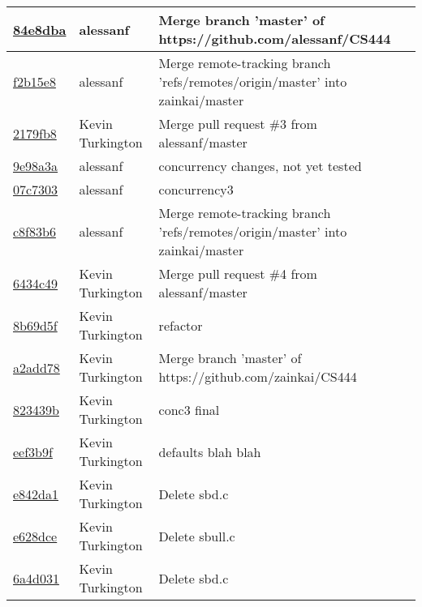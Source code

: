 \begin{tabular}{l l l}
\href{https://github.com/zainkai/CS444/commit/84e8dbaa2bb41903b99d0541490d3b34dc2dabea}{84e8dba} & alessanf & Merge branch 'master' of https://github.com/alessanf/CS444\\\hline
\href{https://github.com/zainkai/CS444/commit/f2b15e83f9cb7c13152067b7b048fbfa8ca9c610}{f2b15e8} & alessanf & Merge remote-tracking branch 'refs/remotes/origin/master' into zainkai/master\\\hline
\href{https://github.com/zainkai/CS444/commit/2179fb8dc4621a3032634abf60185135ab19f5ae}{2179fb8} & Kevin Turkington & Merge pull request \#3 from alessanf/master\\\hline
\href{https://github.com/zainkai/CS444/commit/9e98a3ac066f06665e03a533697abd42e550fb2f}{9e98a3a} & alessanf & concurrency changes, not yet tested\\\hline
\href{https://github.com/zainkai/CS444/commit/07c73034dd65c9e3a6fc66a623a206ad23683823}{07c7303} & alessanf & concurrency3\\\hline
\href{https://github.com/zainkai/CS444/commit/c8f83b6e1cf43d32085f6371b665d0d573808501}{c8f83b6} & alessanf & Merge remote-tracking branch 'refs/remotes/origin/master' into zainkai/master\\\hline
\href{https://github.com/zainkai/CS444/commit/6434c4946005af9ff97065f15c5d018a19c8d3cc}{6434c49} & Kevin Turkington & Merge pull request \#4 from alessanf/master\\\hline
\href{https://github.com/zainkai/CS444/commit/8b69d5f15f1be5a1c19a962eb71ba51a474ae707}{8b69d5f} & Kevin Turkington & refactor\\\hline
\href{https://github.com/zainkai/CS444/commit/a2add7836ea000d471ccfb438ecb88b5184cdd89}{a2add78} & Kevin Turkington & Merge branch 'master' of https://github.com/zainkai/CS444\\\hline
\href{https://github.com/zainkai/CS444/commit/823439be0270f86635be790d8c7fc44e7c7a9736}{823439b} & Kevin Turkington & conc3 final\\\hline
\href{https://github.com/zainkai/CS444/commit/eef3b9f809ff22a915b032dcd97a480609d2ac0f}{eef3b9f} & Kevin Turkington & defaults blah blah\\\hline
\href{https://github.com/zainkai/CS444/commit/e842da161fb450acd0479191b07e836c2ffa9a47}{e842da1} & Kevin Turkington & Delete sbd.c\\\hline
\href{https://github.com/zainkai/CS444/commit/e628dce7300c7fd5dcea8336688b38ebf154d7a8}{e628dce} & Kevin Turkington & Delete sbull.c\\\hline
\href{https://github.com/zainkai/CS444/commit/6a4d0316f275c8c1fa5c0ff823a93ccaf80b1561}{6a4d031} & Kevin Turkington & Delete sbd.c\\\hline

\end{tabular}
